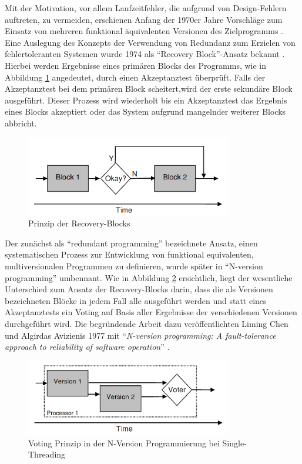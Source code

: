 %
Mit der Motivation, vor allem Laufzeitfehler, die aufgrund von Design-Fehlern auftreten, zu vermeiden, erschienen Anfang der 1970er Jahre Vorschläge zum Einsatz von mehreren funktional äquivalenten Versionen des Zielprogramms \cite{methodology}.
Eine Auslegung des Konzepts der Verwendung von Redundanz zum Erzielen von fehlertoleranten Systemen wurde 1974 als \enquote{Recovery Block}-Ansatz bekannt \cite{Horning:1974:PSE:647641.733522}.
Hierbei werden Ergebnisse eines primären Blocks des Programms, wie in Abbildung \ref{graph-recovery} angedeutet, durch einen Akzeptanztest überprüft.
Falls der Akzeptanztest bei dem primären Block scheitert,wird der erste sekundäre Block ausgeführt. Dieser Prozess wird wiederholt bis ein Akzeptanztest das Ergebnis eines Blocks akzeptiert oder das System aufgrund mangelnder weiterer Blocks abbricht.
%
%
\begin{figure}[ht]
	\centering
	\includegraphics[width=0.8\textwidth,natwidth=901,natheight=351]{grafiken/recovery-block.png}
	\caption{Prinzip der Recovery-Blocks \cite{lucent}}
	\label{graph-recovery}
\end{figure}
%
%
Der zunächst als \enquote{redundant programming} bezeichnete Ansatz, einen systematischen Prozess zur Entwicklung von funktional equivalenten, multiversionalen Programmen zu definieren, wurde später in \enquote{N-version programming} umbennant.
Wie in Abbildung \ref{graph-n-version-single} ersichtlich, liegt der wesentliche Unterschied zum Ansatz der Recovery-Blocks darin, dass die als Versionen bezeichneten Blöcke in jedem Fall alle ausgeführt werden und statt eines Akzeptanztests ein Voting auf Basis aller Ergebnisse der verschiedenen Versionen durchgeführt wird.
Die begründende Arbeit dazu veröffentlichten Liming Chen und Algirdas Avizienis 1977 mit \enquote{\emph{N-version programming: A fault-tolerance approach to reliability of software operation}} \cite{Chen1978}.
%
%
\begin{figure}[ht]
	\centering
	\includegraphics[width=0.8\textwidth,natwidth=901,natheight=333]{grafiken/single-thread-n-version.png}
	\caption{Voting Prinzip in der N-Version Programmierung bei Single-Threading \cite{lucent}}
	\label{graph-n-version-single}
\end{figure}
%
%

